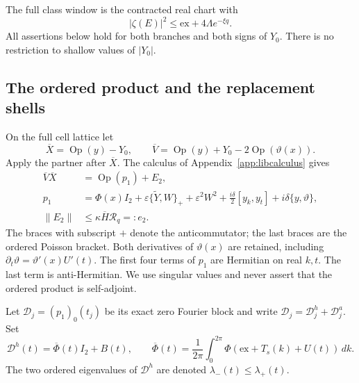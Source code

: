 The full class window is the contracted real chart with
\begin{equation}\label{eq:libfullwindow}
 |\zeta(E)|^2\le\mathrm{ex}+4\Lambda e^{-\xi q}.
\end{equation}
All assertions below hold for both branches and both signs of $Y_0$.
There is no restriction to shallow values of $|Y_0|$.

\subsection{The ordered product and the replacement shells}

On the full cell lattice let
\[
 \overline X=\operatorname{Op}(y)-Y_0,\qquad
 \overline V=\operatorname{Op}(y)+Y_0
             -2\operatorname{Op}(\vartheta(x)).
\]
Apply the partner after $\overline X$. The calculus of
Appendix~\ref{app:libcalculus} gives
\begin{equation}\label{eq:libproduct}
 \begin{split}
 \overline V\overline X&=\operatorname{Op}(p_1)+E_2,\\
 p_1&=\Phi(x)I_2+\varepsilon\{\widetilde Y,W\}_+
        +\varepsilon^2W^2
        +\frac{i\delta}{2}[y_k,y_t]
        +i\delta\{y,\vartheta\},\\
 \|E_2\|&\le\kappa\overline H\mathcal R_q=:e_2.
 \end{split}
\end{equation}
The braces with subscript $+$ denote the anticommutator; the last
braces are the ordered Poisson bracket. Both derivatives of
$\vartheta(x)$ are retained, including
$\partial_t\vartheta=\vartheta'(x)U'(t)$.
The first four terms of $p_1$ are Hermitian on real $k,t$.
The last term is anti-Hermitian. We use singular values and never
assert that the ordered product is self-adjoint.

Let $\mathcal D_j=(p_1)_0(t_j)$ be its exact zero Fourier block and
write $\mathcal D_j=\mathcal D_j^h+\mathcal D_j^a$.
Set
\[
 \mathcal D^h(t)=\overline\Phi(t)I_2+B(t),\qquad
 \overline\Phi(t)=\frac1{2\pi}\int_0^{2\pi}
             \Phi(\mathrm{ex}+T_s(k)+U(t))\,dk.
\]
The two ordered eigenvalues of $\mathcal D^h$ are denoted
$\lambda_-(t)\le\lambda_+(t)$.

